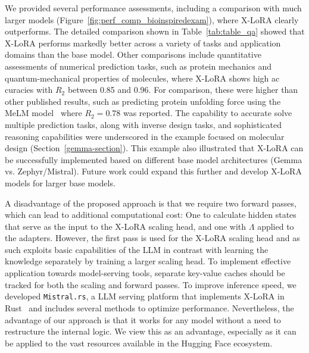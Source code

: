 \documentclass{article}
\begin{document}
We provided several performance assessments, including a comparison with much larger models (Figure~\ref{fig:perf_comp_bioinspiredexam}), where X-LoRA clearly outperforms. The detailed comparison shown in Table~\ref{tab:table_qa} showed that X-LoRA performs markedly better across a variety of tasks and application domains than the base model. Other comparisons include quantitative assessments of numerical prediction tasks, such as protein mechanics and quantum-mechanical properties of molecules, where X-LoRA shows high ac curacies with $R_2$ between 0.85 and 0.96. For comparison, these were higher than other published results, such as predicting protein unfolding force using the MeLM model~\cite{Buehler2023MeLMProblemsb} where  $R_2=0.78$ was reported. The capability to accurate solve multiple prediction tasks, along with inverse design tasks, and sophisticated reasoning capabilities were underscored in the example focused on molecular design (Section~\ref{gemma-section}). This example also illustrated that X-LoRA can be successfully implemented based on different base model architectures (Gemma vs. Zephyr/Mistral). Future work could expand this further and develop X-LoRA models for larger base models. 
 
A disadvantage of the proposed approach is that we require two forward passes, which can lead to additional computational cost: One to calculate hidden states that serve as the input to the X-LoRA scaling head, and one with $\Lambda$ applied to the adapters. However, the first pass is used for the X-LoRA scaling head and as such exploits basic capabilities of the LLM in contrast with learning the knowledge separately by training a larger scaling head. To implement effective application towards model-serving tools, separate key-value caches should be tracked for both the scaling and forward passes. To improve inference speed, we developed \texttt{Mistral.rs}, a LLM serving platform that implements X-LoRA in Rust~\cite{matsakis2014rust} and includes several methods to optimize performance. Nevertheless, the advantage of our approach is that it works for any model without a need to restructure the internal logic. We view this as an advantage, especially as it can be applied to the vast resources available in the Hugging Face ecosystem.
\end{document}
